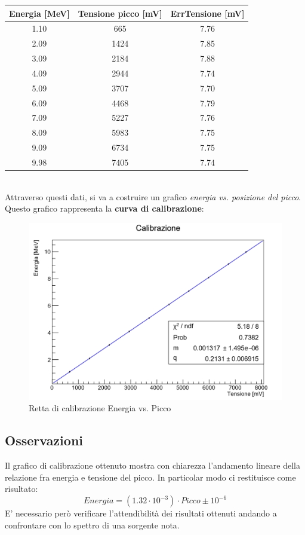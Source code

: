 \documentclass[a4paper,10pt]{article}
\begin{document}
\begin{tabular}{ccc}
\toprule
Energia [MeV] & Tensione picco [mV] & ErrTensione [mV]\\
\midrule
1.10 & 665 & 7.76\\
2.09 & 1424 & 7.85\\
3.09 & 2184 & 7.88\\
4.09 & 2944 & 7.74\\
5.09 & 3707 & 7.70\\
6.09 & 4468 & 7.79\\
7.09 & 5227 & 7.76\\
8.09 & 5983 & 7.75\\
9.09 & 6734 & 7.75\\
9.98 & 7405 & 7.74\\
\bottomrule
\end{tabular}\\

Attraverso questi dati, si va a costruire un grafico \textit{energia vs. posizione del picco}. Questo grafico rappresenta la \textbf{curva di calibrazione}:\\

\begin{figure}[h!]
\centering
\includegraphics[scale=0.5]{rettacalibrazione.jpg}
\caption{Retta di calibrazione Energia vs. Picco}
\end{figure}

\subsection{Osservazioni}
Il grafico di calibrazione ottenuto mostra con chiarezza l'andamento lineare della relazione fra energia e tensione del picco. In particolar modo ci restituisce come risultato: 
\[
Energia = (1.32\cdot10^{-3})\cdot Picco \pm 10^{-6}
\]
E' necessario però verificare l'attendibilità dei risultati ottenuti andando a confrontare con lo spettro di una sorgente nota.
\end{document}
